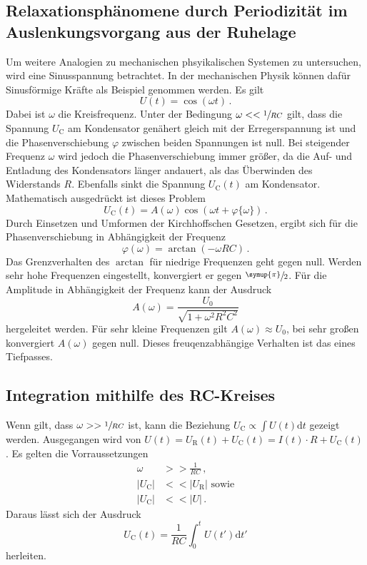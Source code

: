 \subsection{Relaxationsphänomene durch Periodizität im Auslenkungsvorgang
aus der Ruhelage}
Um weitere Analogien zu mechanischen phsyikalischen Systemen zu untersuchen,
wird eine Sinusspannung betrachtet.
In der mechanischen Physik können dafür Sinusförmige Kräfte als Beispiel genommen werden.
Es gilt
\begin{equation}
    U(t)=\cos(\omega t) \, \text{.}
\end{equation}
Dabei ist $\omega$ die Kreisfrequenz.
Unter der Bedingung $\omega<<\sfrac{1}{RC}$ gilt, dass die Spannung $U_\text{C}$ am Kondensator
genähert gleich mit der Erregerspannung ist und
die Phasenverschiebung $\varphi$ zwischen beiden Spannungen ist null.
Bei steigender Frequenz $\omega$ wird jedoch die Phasenverschiebung immer größer,
da die Auf- und Entladung des Kondensators länger andauert, als das Überwinden des
Widerstands $R$. Ebenfalls sinkt die Spannung $U_\text{C}(t)$ am Kondensator.
Mathematisch ausgedrückt ist dieses Problem 
\begin{equation}
    U_\text{C}(t)=A(\omega)\cos(\omega t+\varphi\{\omega\})\,.
\end{equation}
Durch Einsetzen und Umformen der Kirchhoffschen Gesetzen, ergibt sich für die Phasenverschiebung
in Abhängigkeit der Frequenz
\begin{equation}
    \varphi(\omega)=\arctan(-\omega RC)\,.
\end{equation}
Das Grenzverhalten des $\arctan$ für niedrige Frequenzen geht gegen null.
Werden sehr hohe Frequenzen eingestellt, konvergiert er gegen $\sfrac{\symup{\pi}}{2}$.
Für die Amplitude in Abhängigkeit der Frequenz kann der Ausdruck
\begin{equation}
    A(\omega)=\frac{U_0}{\sqrt{1+\omega^2R^2C^2}}
\end{equation}
hergeleitet werden. Für sehr kleine Frequenzen gilt $A(\omega)\approx U_0$, bei sehr großen
konvergiert $A(\omega)$ gegen null. Dieses freuqenzabhängige Verhalten ist das eines
Tiefpasses.
\subsection{Integration mithilfe des RC-Kreises}
Wenn gilt, dass $\omega >>\sfrac{1}{RC}$ ist, kann die Beziehung
$U_\text{C}\propto\int U(t)\text{d}t$ gezeigt werden. Ausgegangen wird von
$U(t)=U_\text{R}(t)+U_\text{C}(t)=I(t)\cdot R+U_\text{C}(t)$.
Es gelten die Vorraussetzungen
\begin{align}
    \omega &>>\frac{1}{RC}\,,\\
    |U_\text{C}|&<<|U_\text{R}|\text{ sowie}\\
    |U_\text{C}|&<<|U|\,.
\end{align}
Daraus lässt sich der Ausdruck
\begin{equation}
    U_\text{C}(t)=\frac{1}{RC}\int_0^t U(t')\text{d}t'
\end{equation}
herleiten.